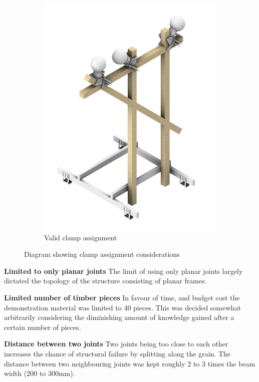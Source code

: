\begin{figure}
\begin{subfigure}[b]{0.32\textwidth}
        \includegraphics[width=\textwidth]{images/05/clamp-assignment-3.png}
        \caption{Valid clamp assignment}
        \label{fig:clamp-assignment-3}
    \end{subfigure}
    \caption{Diagram showing clamp assignment considerations}
    \label{fig:clamp-assignment}
\end{figure}

\textbf{Limited to only planar joints} The limit of using only planar joints largely dictated the topology of the structure consisting of planar frames. 

\textbf{Limited number of timber pieces} In favour of time, and budget cost the demonstration material was limited to 40 pieces. This was decided somewhat arbitrarily considering the diminishing amount of knowledge gained after a certain number of pieces.

\textbf{Distance between two joints} Two joints being too close to each other increases the chance of structural failure by splitting along the grain. The distance between two neighbouring joints was kept roughly 2 to 3 times the beam width (200 to 300mm).

